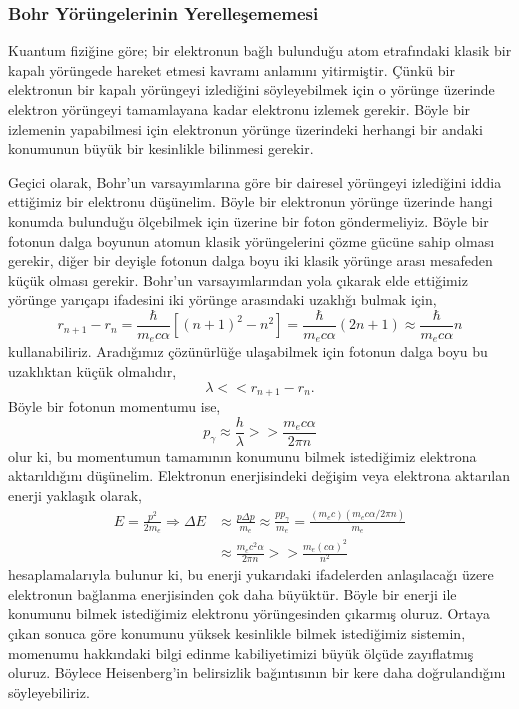 \documentclass[a4paper,12pt, twoside]{article}
\begin{document}
\subsubsection{Bohr Yörüngelerinin Yerelleşememesi}
Kuantum fiziğine göre; bir elektronun bağlı bulunduğu atom etrafındaki klasik bir kapalı yörüngede hareket etmesi kavramı anlamını yitirmiştir. Çünkü bir elektronun bir kapalı yörüngeyi izlediğini söyleyebilmek için o yörünge üzerinde elektron yörüngeyi tamamlayana kadar elektronu izlemek gerekir. Böyle bir izlemenin yapabilmesi için elektronun yörünge üzerindeki herhangi bir andaki konumunun büyük bir kesinlikle bilinmesi gerekir.

Geçici olarak, Bohr'un varsayımlarına göre bir dairesel yörüngeyi izlediğini iddia ettiğimiz bir elektronu düşünelim. Böyle bir elektronun yörünge üzerinde hangi konumda bulunduğu ölçebilmek için üzerine bir foton göndermeliyiz. Böyle bir fotonun dalga boyunun atomun klasik yörüngelerini çözme gücüne sahip olması gerekir, diğer bir deyişle fotonun dalga boyu iki klasik yörünge arası mesafeden küçük olması gerekir. Bohr'un varsayımlarından yola çıkarak elde ettiğimiz yörünge yarıçapı ifadesini iki yörünge arasındaki uzaklığı bulmak için,
\begin{equation*}
r _ { n + 1 } - r _ { n } = \frac { \hbar } { m _ { e } c \alpha } \left[ ( n + 1 ) ^ { 2 } - n ^ { 2 } \right] = \frac { \hbar } { m _ { e } c \alpha } (2n+1) \approx \frac { \hbar } { m _ { e } c \alpha } n
\end{equation*}
kullanabiliriz. Aradığımız çözünürlüğe ulaşabilmek için fotonun dalga boyu bu uzaklıktan küçük olmalıdır,
\begin{equation*}
\lambda << r _ { n + 1 } - r _ { n }.
\end{equation*}
Böyle bir fotonun momentumu ise,
\begin{equation*}
p_{ \gamma } \approx \frac { h } { \lambda } >> \frac { m _ { e } c \alpha } { 2\pi n }
\end{equation*}
olur ki, bu momentumun tamamının konumunu bilmek istediğimiz elektrona aktarıldığını düşünelim. Elektronun enerjisindeki değişim veya elektrona aktarılan enerji yaklaşık olarak,
\begin{align*}
E = \frac{p^2}{2m_e} \Rightarrow \Delta E &\approx \frac { p \Delta p } { m _ { e } } \approx \frac { p p _ { \gamma } } { m _ { e } } = \frac{(m_e c) (m_e c \alpha/2\pi n)}{m_e}\\
&\approx \frac { m_e c^2 \alpha} { 2\pi n } >> \frac { m _ { e } ( c \alpha ) ^ { 2 } } { n ^ { 2 } }
\end{align*}
hesaplamalarıyla bulunur ki, bu enerji yukarıdaki ifadelerden anlaşılacağı üzere elektronun bağlanma enerjisinden çok daha büyüktür. Böyle bir enerji ile konumunu bilmek istediğimiz elektronu yörüngesinden çıkarmış oluruz. Ortaya çıkan sonuca göre konumunu yüksek kesinlikle bilmek istediğimiz sistemin, momenumu hakkındaki bilgi edinme kabiliyetimizi büyük ölçüde zayıflatmış oluruz. Böylece Heisenberg'in belirsizlik bağıntısının bir kere daha doğrulandığını söyleyebiliriz.
\end{document}
